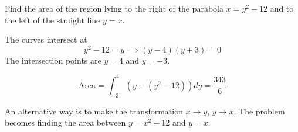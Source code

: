 \documentclass[../main.tex]{subfiles}
\begin{document}
\begin{example}
	Find the area of the region lying to the right of the parabola $x=y^2-12$ and to the left of the straight line $y=x$.
\end{example}
\begin{minipage}{0.5\textwidth}
  \begin{solution}
  	The curves intersect at
  	\[
  		y^2 - 12 = y \implies (y-4)(y+3) = 0
  	\]
  	The intersection points are $y=4$ and $y=-3$.

  	\[
  		\text{Area} = \int_{-3}^4 \left( y - (y^2-12)  \right) dy = \frac{343}{6}
  	\]

  	An alternative way is to make the transformation $x \to y$, $y \to x$. The problem becomes finding the area between $y=x^2-12$ and $y=x$.
  \end{solution}
\end{minipage}%
\begin{minipage}{0.5\textwidth}
  \begin{figure}[H]
    	\centering
    	
   \end{figure}
\end{minipage}
\end{document}

